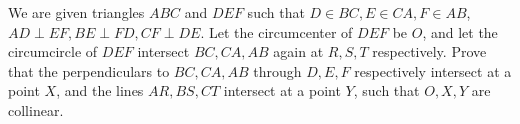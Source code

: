We are given triangles $ABC$ and $DEF$ such that $D\in BC, E\in CA, F\in AB$, $AD\perp EF, BE\perp FD, CF\perp DE$.  Let the circumcenter of $DEF$ be $O$, and let the circumcircle of $DEF$ intersect $BC,CA,AB$ again at $R,S,T$ respectively. Prove that the perpendiculars to $BC,CA,AB$ through $D,E,F$ respectively intersect at a point $X$, and the lines $AR,BS,CT$ intersect at a point $Y$, such that $O,X,Y$ are collinear.


